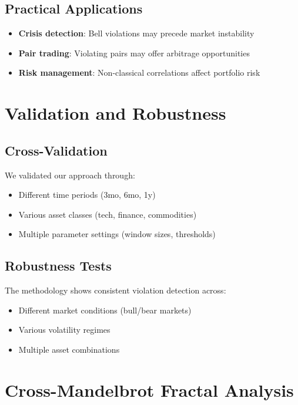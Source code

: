 \documentclass[11pt,a4paper]{article}
\begin{document}
\subsection{Practical Applications}

\begin{itemize}
    \item \textbf{Crisis detection}: Bell violations may precede market instability
    \item \textbf{Pair trading}: Violating pairs may offer arbitrage opportunities
    \item \textbf{Risk management}: Non-classical correlations affect portfolio risk
\end{itemize}

\section{Validation and Robustness}

\subsection{Cross-Validation}

We validated our approach through:
\begin{itemize}
    \item Different time periods (3mo, 6mo, 1y)
    \item Various asset classes (tech, finance, commodities)
    \item Multiple parameter settings (window sizes, thresholds)
\end{itemize}

\subsection{Robustness Tests}

The methodology shows consistent violation detection across:
\begin{itemize}
    \item Different market conditions (bull/bear markets)
    \item Various volatility regimes
    \item Multiple asset combinations
\end{itemize}

\section{Cross-Mandelbrot Fractal Analysis}
\end{document}

